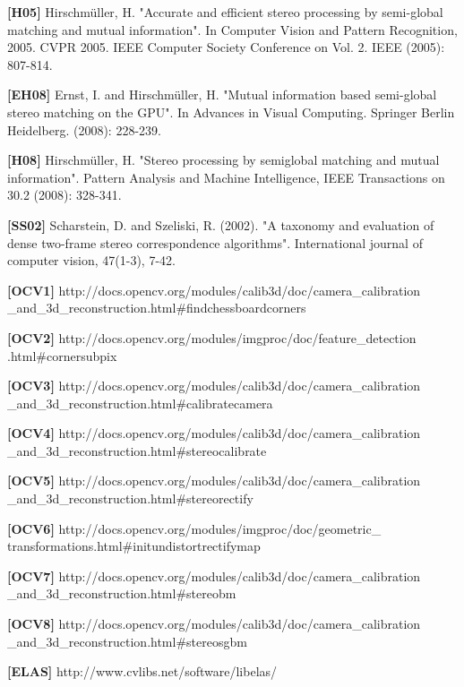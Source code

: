 \documentclass[11pt,a4paper,titlepage]{article}
\begin{document}
\textbf{[H05]} Hirschmüller, H. "Accurate and efficient stereo processing by semi-global matching and mutual information". In Computer Vision and Pattern Recognition, 2005. CVPR 2005. IEEE Computer Society Conference on Vol. 2. IEEE (2005): 807-814.

\textbf{[EH08]} Ernst, I. and Hirschmüller, H. "Mutual information based semi-global stereo matching on the GPU". In Advances in Visual Computing. Springer Berlin Heidelberg. (2008): 228-239.

\textbf{[H08]} Hirschmüller, H. "Stereo processing by semiglobal matching and mutual information". Pattern Analysis and Machine Intelligence, IEEE Transactions on 30.2 (2008): 328-341.

\textbf{[SS02]} Scharstein, D. and Szeliski, R. (2002). "A taxonomy and evaluation of dense two-frame stereo correspondence algorithms". International journal of computer vision, 47(1-3), 7-42.

\textbf{[OCV1]} http:\slash\slash docs.opencv.org\slash modules\slash calib3d\slash doc\slash camera\_calibration
\_and\_3d\_reconstruction.html\#findchessboardcorners

\textbf{[OCV2]} http:\slash \slash docs.opencv.org\slash modules\slash imgproc\slash doc\slash feature\_detection
.html\#cornersubpix

\textbf{[OCV3]} http:\slash \slash docs.opencv.org\slash modules\slash calib3d\slash doc\slash camera\_calibration
\_and\_3d\_reconstruction.html\#calibratecamera

\textbf{[OCV4]} http:\slash \slash docs.opencv.org\slash modules\slash calib3d\slash doc\slash camera\_calibration
\_and\_3d\_reconstruction.html\#stereocalibrate

\textbf{[OCV5]} http:\slash \slash docs.opencv.org\slash modules\slash calib3d\slash doc\slash camera\_calibration
\_and\_3d\_reconstruction.html\#stereorectify

\textbf{[OCV6]} http:\slash \slash docs.opencv.org\slash modules\slash imgproc\slash doc\slash geometric\_
transformations.html\#initundistortrectifymap

\textbf{[OCV7]} http:\slash \slash docs.opencv.org\slash modules\slash calib3d\slash doc\slash camera\_calibration
\_and\_3d\_reconstruction.html\#stereobm

\textbf{[OCV8]} http:\slash \slash docs.opencv.org\slash modules\slash calib3d\slash doc\slash camera\_calibration
\_and\_3d\_reconstruction.html\#stereosgbm

\textbf{[ELAS]} http://www.cvlibs.net/software/libelas/
\end{document}
